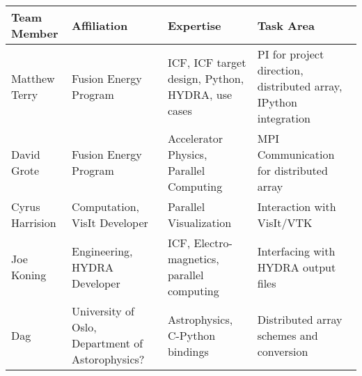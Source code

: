 \documentclass[a4paper]{article}
\newlength{\DUtablewidth} %
\begin{document}
\setlength{\DUtablewidth}{\linewidth}
\begin{longtable*}[c]{|p{0.187\DUtablewidth}|p{0.251\DUtablewidth}|p{0.260\DUtablewidth}|p{0.251\DUtablewidth}|}
	\hline
	\textbf{Team Member} & \textbf{Affiliation} & \textbf{Expertise} & \textbf{Task Area} \\
	\hline
	\endfirsthead
	\hline

	Matthew Terry &
	Fusion Energy Program &
	ICF, ICF target design, Python, HYDRA, use cases &
	PI for project direction, distributed array, IPython integration \\
	\hline

	David Grote &
	Fusion Energy Program &
	Accelerator Physics, Parallel Computing &
	MPI Communication for distributed array \\
	\hline

	Cyrus Harrision &
	Computation, VisIt Developer &
	Parallel Visualization &
	Interaction with VisIt/VTK  \\
	\hline

	Joe Koning &
	Engineering, HYDRA Developer & 
	ICF, Electro-magnetics, parallel computing & 
	Interfacing with HYDRA output files \\
	\hline

	Dag & 
	University of Oslo, Department of Astorophysics? & 
	Astrophysics, C-Python bindings &
	Distributed array schemes and conversion \\
	\hline
\end{longtable*}


\end{document}
